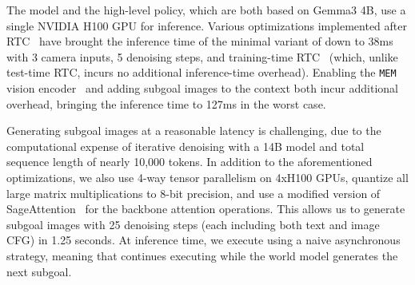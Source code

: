 
\label{app:inference}
The \MethodName{} model and the high-level policy, which are both based on Gemma3 4B, use a single NVIDIA H100 GPU for inference. Various optimizations implemented after RTC~\citep{black2025real} have brought the inference time of the minimal variant of \MethodName{} down to 38ms with 3 camera inputs, 5 denoising steps, and training-time RTC~\citep{black2025ttrtc} (which, unlike test-time RTC, incurs no additional inference-time overhead). Enabling the \texttt{MEM} vision encoder~\citep{torne2026mem} and adding subgoal images to the context both incur additional overhead, bringing the inference time to 127ms in the worst case.

Generating subgoal images at a reasonable latency is challenging, due to the computational expense of iterative denoising with a 14B model and total sequence length of nearly 10,000 tokens. In addition to the aforementioned optimizations, we also use 4-way tensor parallelism on 4xH100 GPUs, quantize all large matrix multiplications to 8-bit precision, and use a modified version of SageAttention~\citep{zhang2024sageattention} for the backbone attention operations. This allows us to generate subgoal images with 25 denoising steps (each including both text and image CFG) in 1.25 seconds. At inference time, we execute using a naive asynchronous strategy, meaning that \MethodName{} continues executing while the world model generates the next subgoal.

